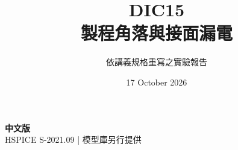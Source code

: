 \documentclass[11pt,a4paper]{article}
\title{\color{accent}DIC15\\[4pt]製程角落與接面漏電}
\author{依講義規格重寫之實驗報告}
\date{17 October 2026}
\begin{document}
\maketitle
\begin{center}\small\textbf{中文版}\\
HSPICE S-2021.09 \quad | \quad 模型庫另行提供
\end{center}


\end{document}
